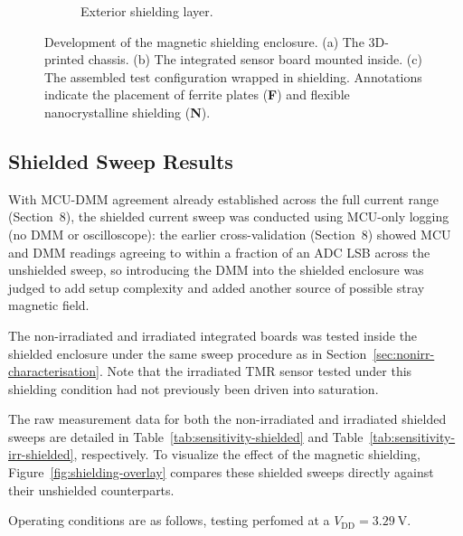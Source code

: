 \documentclass[12pt,a4paper]{article}
\begin{document}
\begin{figure}[H]
\begin{subfigure}[b]{0.32\textwidth}
        \caption{Exterior shielding layer.}
        \label{fig:box_nano}
    \end{subfigure}
    
    \caption{Development of the magnetic shielding enclosure. (a) The 3D-printed chassis. (b) The integrated sensor board mounted inside. (c) The assembled test configuration wrapped in shielding. Annotations indicate the placement of ferrite plates (\textbf{F}) and flexible nanocrystalline shielding (\textbf{N}).} 
    \label{fig:shielding_enclosure}
\end{figure}
    

\subsection{Shielded Sweep Results}
\label{sec:shielded-results}

With MCU-DMM agreement already established across the full current range (Section~8), the shielded current sweep was conducted using MCU-only logging (no DMM or oscilloscope): the earlier cross-validation (Section~8) showed MCU and DMM readings agreeing to within a fraction of an ADC LSB across the unshielded sweep, so introducing the DMM into the shielded enclosure was judged to add setup complexity and added another source of possible stray magnetic field.

The non-irradiated and irradiated integrated boards was tested inside the shielded enclosure under the same sweep procedure as in Section~\ref{sec:nonirr-characterisation}.  Note that the irradiated TMR sensor tested under this shielding condition had not previously been driven into saturation. 

The raw measurement data for both the non-irradiated and irradiated shielded sweeps are detailed in Table~\ref{tab:sensitivity-shielded} and Table~\ref{tab:sensitivity-irr-shielded}, respectively. To visualize the effect of the magnetic shielding, Figure~\ref{fig:shielding-overlay} compares these shielded sweeps directly against their unshielded counterparts.

Operating conditions are as follows, testing perfomed at a $V_{\text{DD}} = \SI{3.29}{\volt}$.
\end{document}
